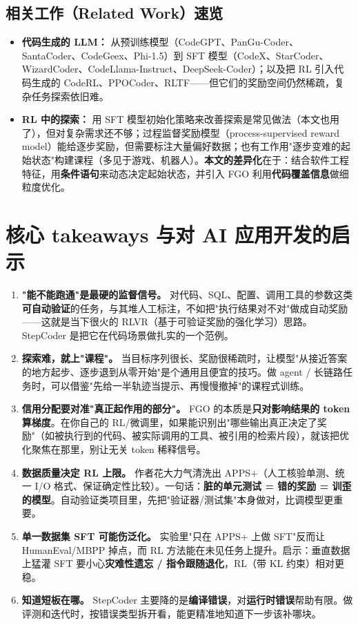 \documentclass[11pt,UTF8,fontset=fandol]{ctexart}
\begin{document}
\subsection{相关工作（Related Work）速览}

\begin{itemize}[leftmargin=2em]
\item \textbf{代码生成的 LLM：} 从预训练模型（CodeGPT、PanGu-Coder、SantaCoder、CodeGeex、Phi-1.5）到 SFT 模型（CodeX、StarCoder、WizardCoder、CodeLlama-Instruct、DeepSeek-Coder）；以及把 RL 引入代码生成的 CodeRL、PPOCoder、RLTF——但它们的奖励空间仍然稀疏，复杂任务探索依旧难。
\item \textbf{RL 中的探索：} 用 SFT 模型初始化策略来改善探索是常见做法（本文也用了），但对复杂需求还不够；过程监督奖励模型（process-supervised reward model）能给逐步奖励，但需要标注大量偏好数据；也有工作用"逐步变难的起始状态"构建课程（多见于游戏、机器人）。\textbf{本文的差异化}在于：结合软件工程特征，用\textbf{条件语句}来动态决定起始状态，并引入 FGO 利用\textbf{代码覆盖信息}做细粒度优化。
\end{itemize}

\section{核心 takeaways 与对 AI 应用开发的启示}

\begin{enumerate}[leftmargin=2em]
\item \textbf{"能不能跑通"是最硬的监督信号。} 对代码、SQL、配置、调用工具的参数这类\textbf{可自动验证}的任务，与其堆人工标注，不如把"执行结果对不对"做成自动奖励——这就是当下很火的 RLVR（基于可验证奖励的强化学习）思路。StepCoder 是把它在代码场景做扎实的一个范例。
\item \textbf{探索难，就上"课程"。} 当目标序列很长、奖励很稀疏时，让模型"从接近答案的地方起步、逐步退到从零开始"是个通用且便宜的技巧。做 agent / 长链路任务时，可以借鉴"先给一半轨迹当提示、再慢慢撤掉"的课程式训练。
\item \textbf{信用分配要对准"真正起作用的部分"。} FGO 的本质是\textbf{只对影响结果的 token 算梯度}。在你自己的 RL/微调里，如果能识别出"哪些输出真正决定了奖励"（如被执行到的代码、被实际调用的工具、被引用的检索片段），就该把优化聚焦在那里，别让无关 token 稀释信号。
\item \textbf{数据质量决定 RL 上限。} 作者花大力气清洗出 APPS+（人工核验单测、统一 I/O 格式、保证确定性比较）。一句话：\textbf{脏的单元测试 = 错的奖励 = 训歪的模型}。自动验证类项目里，先把"验证器/测试集"本身做对，比调模型更重要。
\item \textbf{单一数据集 SFT 可能伤泛化。} 实验里"只在 APPS+ 上做 SFT"反而让 HumanEval/MBPP 掉点，而 RL 方法能在未见任务上提升。启示：垂直数据上猛灌 SFT 要小心\textbf{灾难性遗忘 / 指令跟随退化}，RL（带 KL 约束）相对更稳。
\item \textbf{知道短板在哪。} StepCoder 主要降的是\textbf{编译错误}，对\textbf{运行时错误}帮助有限。做评测和迭代时，按错误类型拆开看，能更精准地知道下一步该补哪块。
\end{enumerate}
\end{document}
